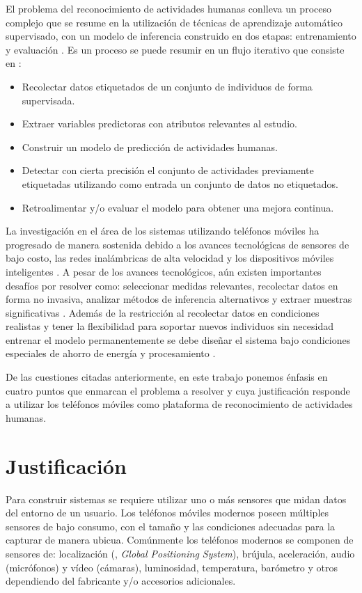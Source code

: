 El problema del reconocimiento de actividades humanas conlleva un
proceso complejo que se resume en la utilización de técnicas de aprendizaje
automático supervisado, con un modelo de inferencia construido en
dos etapas: entrenamiento y evaluación \cite{LaraLabrador2013,Kwapisz2011}.
Es un proceso se puede resumir en un flujo iterativo que consiste
en \cite{Bao2004}:
\begin{itemize}
\item Recolectar datos etiquetados de un conjunto de individuos de forma
supervisada. 
\item Extraer variables predictoras con atributos relevantes al estudio.
\item Construir un modelo de predicción de actividades humanas.
\item Detectar con cierta precisión el conjunto de actividades previamente
etiquetadas utilizando como entrada un conjunto de datos no etiquetados.
\item Retroalimentar y/o evaluar el modelo para obtener una mejora continua.
\end{itemize}
La investigación en el área de los sistemas  utilizando
teléfonos móviles ha progresado de manera sostenida debido a los avances
tecnológicas de sensores de bajo costo, las redes inalámbricas de
alta velocidad y los dispositivos móviles inteligentes \cite{Chen2012}.
A pesar de los avances tecnológicos, aún existen importantes desafíos
por resolver como: seleccionar medidas relevantes, recolectar datos
en forma no invasiva, analizar métodos de inferencia alternativos
y extraer muestras significativas \cite{LaraLabrador2013}. Además
de la restricción al recolectar datos en condiciones realistas y tener
la flexibilidad para soportar nuevos individuos sin necesidad entrenar
el modelo permanentemente se debe diseñar el sistema bajo condiciones
especiales de ahorro de energía y procesamiento \cite{ReyesOrtiz2015}. 

De las cuestiones citadas anteriormente, en este trabajo ponemos énfasis
en cuatro puntos que enmarcan el problema a resolver y cuya justificación
responde a utilizar los teléfonos móviles como plataforma de reconocimiento
de actividades humanas.

\section{Justificación}

\label{sec12:justificaciuxf3n}

Para construir sistemas  se requiere utilizar uno o más
sensores que midan datos del entorno de un usuario. Los teléfonos
móviles modernos poseen múltiples sensores de bajo consumo, con el
tamaño y las condiciones adecuadas para la capturar de manera ubicua.
Comúnmente los teléfonos modernos se componen de sensores de: localización
(, \emph{Global Positioning System}), brújula, aceleración,
audio (micrófonos) y vídeo (cámaras), luminosidad, temperatura, barómetro
y otros dependiendo del fabricante y/o accesorios adicionales\cite{Kwapisz2011}.

